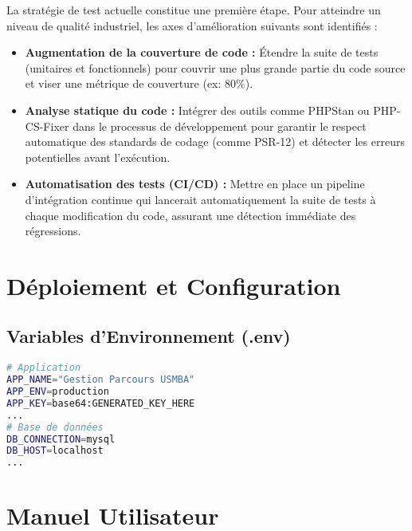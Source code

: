 \documentclass[12pt,a4paper]{report}
\begin{document}
La stratégie de test actuelle constitue une première étape. Pour atteindre un niveau de qualité industriel, les axes d'amélioration suivants sont identifiés :
\begin{itemize}
    \item \textbf{Augmentation de la couverture de code :} Étendre la suite de tests (unitaires et fonctionnels) pour couvrir une plus grande partie du code source et viser une métrique de couverture (ex: 80\%).
    \item \textbf{Analyse statique du code :} Intégrer des outils comme PHPStan ou PHP-CS-Fixer dans le processus de développement pour garantir le respect automatique des standards de codage (comme PSR-12) et détecter les erreurs potentielles avant l'exécution.
    \item \textbf{Automatisation des tests (CI/CD) :} Mettre en place un pipeline d'intégration continue qui lancerait automatiquement la suite de tests à chaque modification du code, assurant une détection immédiate des régressions.
\end{itemize}















\chapter{Déploiement et Configuration}

\section{Variables d'Environnement (.env)}
\begin{lstlisting}[language=bash]
# Application
APP_NAME="Gestion Parcours USMBA"
APP_ENV=production
APP_KEY=base64:GENERATED_KEY_HERE
...
# Base de données
DB_CONNECTION=mysql
DB_HOST=localhost
...
\end{lstlisting}


\chapter{Manuel Utilisateur}
\end{document}
